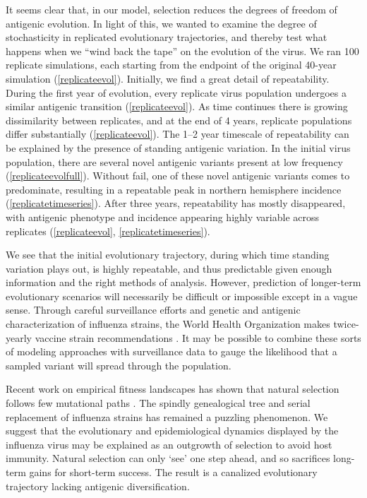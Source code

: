 It seems clear that, in our model, selection reduces the degrees of freedom of antigenic evolution.  In light of this, we wanted to examine the degree of stochasticity in replicated evolutionary trajectories, and thereby test what happens when we ``wind back the tape'' \cite{GouldWonderfulLife} on the evolution of the virus.  We ran 100 replicate simulations, each starting from the endpoint of the original 40-year simulation (\ref{replicateevol}).  Initially, we find a great detail of repeatability.  During the first year of evolution, every replicate virus population undergoes a similar antigenic transition (\ref{replicateevol}).  As time continues there is growing dissimilarity between replicates, and at the end of 4 years, replicate populations differ substantially (\ref{replicateevol}).  The 1--2 year timescale of repeatability can be explained by the presence of standing antigenic variation.  In the initial virus population, there are several novel antigenic variants present at low frequency (\ref{replicateevolfull}).  Without fail, one of these novel antigenic variants comes to predominate, resulting in a repeatable peak in northern hemisphere incidence (\ref{replicatetimeseries}).  After three years, repeatability has mostly disappeared, with antigenic phenotype and incidence appearing highly variable across replicates (\ref{replicateevol}, \ref{replicatetimeseries}).

We see that the initial evolutionary trajectory, during which time standing variation plays out, is highly repeatable, and thus predictable given enough information and the right methods of analysis.  However, prediction of longer-term evolutionary scenarios will necessarily be difficult or impossible except in a vague sense.  Through careful surveillance efforts and genetic and antigenic characterization of influenza strains, the World Health Organization makes twice-yearly vaccine strain recommendations \cite{Barr10}.  It may be possible to combine these sorts of modeling approaches with surveillance data to gauge the likelihood that a sampled variant will spread through the population.

Recent work on empirical fitness landscapes has shown that natural selection follows few mutational paths \cite{Weinreich06}.  The spindly genealogical tree and serial replacement of influenza strains has remained a puzzling phenomenon.  We suggest that the evolutionary and epidemiological dynamics displayed by the influenza virus may be explained as an outgrowth of selection to avoid host immunity.  Natural selection can only `see' one step ahead, and so sacrifices long-term gains for short-term success.  The result is a canalized evolutionary trajectory lacking antigenic diversification.


